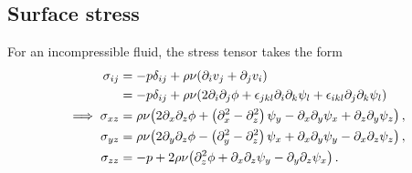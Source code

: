 \documentclass[reqno]{amsart}
\numberwithin{equation}{section}
\numberwithin{figure}{section}
\begin{document}
\subsection{Surface stress}

For an incompressible fluid, the stress tensor takes the form
\begin{align}
\sigma_{ij}
  &= -p\delta_{ij}+\rho\nu\!\left(\partial_{i}v_{j}+\partial_{j}v_{i}\right) \nonumber \\
  &= -p\delta_{ij}+\rho\nu\!\left(2\partial_{i}\partial_{j}\phi+\epsilon_{jkl}\partial_{i}\partial_{k}\psi_{l}+\epsilon_{ikl}\partial_{j}\partial_{k}\psi_{l}\right) \label{eq:fluid-stress} \\
\implies\sigma_{xz}
  &= \rho\nu\!\left(2\partial_{x}\partial_{z}\phi+\left(\partial_{x}^{2}-\partial_{z}^{2}\right)\psi_{y}-\partial_{x}\partial_{y}\psi_{x}+\partial_{z}\partial_{y}\psi_{z}\right), \nonumber \\
\sigma_{yz}
  &= \rho\nu\!\left(2\partial_{y}\partial_{z}\phi-\left(\partial_{y}^{2}-\partial_{z}^{2}\right)\psi_{x}+\partial_{x}\partial_{y}\psi_{y}-\partial_{x}\partial_{z}\psi_{z}\right), \nonumber \\
\sigma_{zz}
  &= -p+2\rho\nu\!\left(\partial_{z}^{2}\phi+\partial_{x}\partial_{z}\psi_{y}-\partial_{y}\partial_{z}\psi_{x}\right). \nonumber
\end{align}
\end{document}
